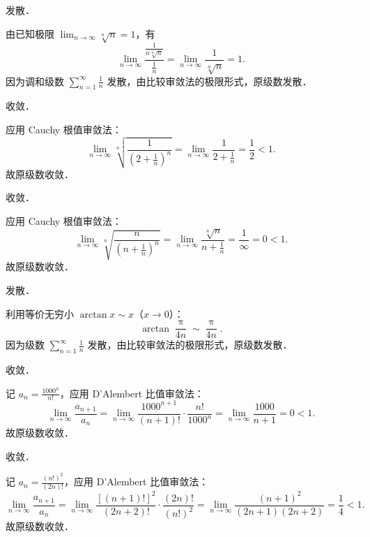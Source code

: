 \begin{solution}
     发散．

    由已知极限 $\lim_{n\to\infty} \sqrt[n]{n} = 1$，有
    \begin{equation}
        \lim_{n\to\infty} \frac{\frac{1}{n\sqrt[n]{n}}}{\frac{1}{n}} = \lim_{n\to\infty} \frac{1}{\sqrt[n]{n}} = 1.
    \end{equation}
    因为调和级数 $\sum_{n=1}^\infty \frac{1}{n}$ 发散，由比较审敛法的极限形式，原级数发散．

     收敛．

    应用 Cauchy 根值审敛法：
    \begin{equation}
        \lim_{n\to\infty} \sqrt[n]{\frac{1}{\left(2 + \frac{1}{n}\right)^n}} = \lim_{n\to\infty} \frac{1}{2 + \frac{1}{n}} = \frac{1}{2} < 1.
    \end{equation}
    故原级数收敛．

     收敛．

    应用 Cauchy 根值审敛法：
    \begin{equation}
        \lim_{n\to\infty} \sqrt[n]{\frac{n}{\left(n + \frac{1}{n}\right)^n}} = \lim_{n\to\infty} \frac{\sqrt[n]{n}}{n + \frac{1}{n}} = \frac{1}{\infty} = 0 < 1.
    \end{equation}
    故原级数收敛．

     发散．

    利用等价无穷小 $\arctan x \sim x$（$x \to 0$）：
    \begin{equation}
        \arctan \frac{\uppi}{4n} \sim \frac{\uppi}{4n}.
    \end{equation}
    因为级数 $\sum_{n=1}^\infty \frac{1}{n}$ 发散，由比较审敛法的极限形式，原级数发散．

     收敛．

    记 $a_n = \frac{1000^n}{n!}$，应用 D'Alembert 比值审敛法：
    \begin{equation}
        \lim_{n\to\infty} \frac{a_{n+1}}{a_n} = \lim_{n\to\infty} \frac{1000^{n+1}}{(n+1)!} \cdot \frac{n!}{1000^n} = \lim_{n\to\infty} \frac{1000}{n+1} = 0 < 1.
    \end{equation}
    故原级数收敛．

     收敛．

    记 $a_n = \frac{(n!)^2}{(2n)!}$，应用 D'Alembert 比值审敛法：
    \begin{equation}
        \lim_{n\to\infty} \frac{a_{n+1}}{a_n} = \lim_{n\to\infty} \frac{[(n+1)!]^2}{(2n+2)!} \cdot \frac{(2n)!}{(n!)^2} = \lim_{n\to\infty} \frac{(n+1)^2}{(2n+1)(2n+2)} = \frac{1}{4} < 1.
    \end{equation}
    故原级数收敛．


\end{solution}
